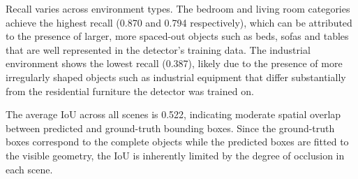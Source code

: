 Recall varies across environment types. The bedroom and living room categories achieve the highest recall (0.870 and 0.794 respectively), which can be attributed to the presence of larger, more spaced-out objects such as beds, sofas and tables that are well represented in the detector's training data. The industrial environment shows the lowest recall (0.387), likely due to the presence of more irregularly shaped objects such as industrial equipment that differ substantially from the residential furniture the detector was trained on.

The average IoU across all scenes is 0.522, indicating moderate spatial overlap between predicted and ground-truth bounding boxes. Since the ground-truth boxes correspond to the complete objects while the predicted boxes are fitted to the visible geometry, the IoU is inherently limited by the degree of occlusion in each scene.



%
%

